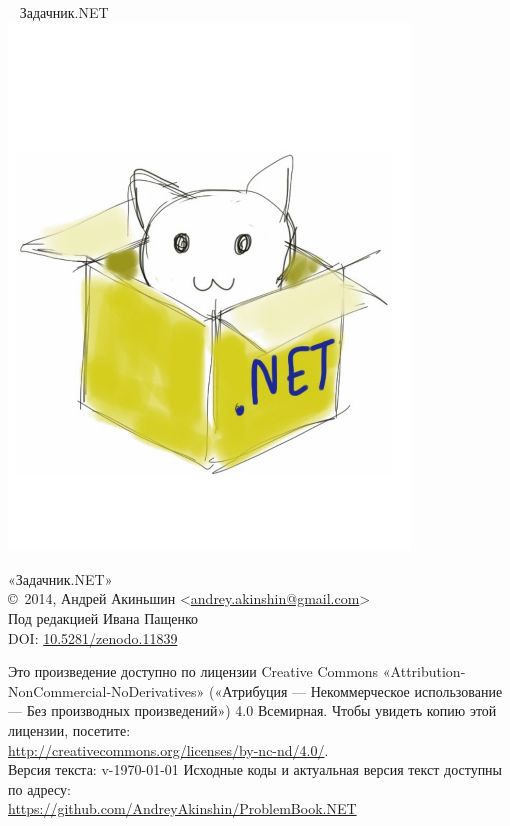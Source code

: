 \begin{center}
~\vspace{4cm}\newline
{\Huge{Задачник.NET}}
\includegraphics[width=0.8\textwidth]{cover}
\end{center}
\newpage

\hbox{}
\vfill
{
\noindent
«Задачник.NET»\\
\copyright\ 2014, Андрей Акиньшин <\href{mailto:andrey.akinshin@gmail.com}{andrey.akinshin@gmail.com}>\\
Под редакцией Ивана Пащенко\\
DOI: \href{http://dx.doi.org/10.5281/zenodo.11839}{10.5281/zenodo.11839}

\medskip
\noindent
Это произведение доступно по лицензии Creative Commons «Attribution-NonCommercial-NoDerivatives» («Атрибуция — Некоммерческое использование — Без производных произведений») 4.0 Всемирная. Чтобы увидеть копию этой лицензии, посетите:\\ \url{http://creativecommons.org/licenses/by-nc-nd/4.0/}.\\
Версия текста: v-\versiondate\today \newline
Исходные коды и актуальная версия текст доступны по адресу:\\ \url{https://github.com/AndreyAkinshin/ProblemBook.NET}
}
\newpage